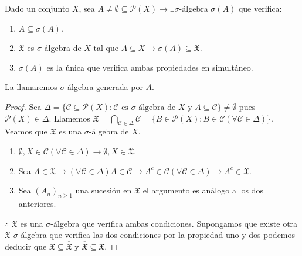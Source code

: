 \begin{prop}
    Dado un conjunto $X$, sea $A \neq \emptyset \subseteq \mathcal{P}(X) \to \exists \sigma$-álgebra $\sigma(A)$ que verifica: \begin{enumerate}
        \item $A \subseteq \sigma(A)$.
        \item $\mathfrak{X}$ es $\sigma$-álgebra de $X$ tal que $A \subseteq X \to \sigma(A) \subseteq \mathfrak{X}$.
        \item $\sigma(A)$ es la única que verifica ambas propiedades en simultáneo.
    \end{enumerate}
    La llamaremos $\sigma$-álgebra generada por $A$.

    \begin{proof}
        Sea $\Delta = \{ \mathscr{C} \subseteq \mathcal{P}(X) : \mathscr{C} \text{ es } \sigma \text{-álgebra de } X \text{ y } A \subseteq \mathscr{C} \} \neq \emptyset$ pues $\mathcal{P}(X) \in \Delta$.
        Llamemos $\mathfrak{X} = \bigcap_{\mathscr{C} \in \Delta} \mathscr{C} = \{ B \in \mathcal{P}(X) : B \in \mathscr{C} (\forall \mathscr{C} \in \Delta) \}$.
        Veamos que $\mathfrak{X}$ es una $\sigma$-álgebra de $X$.
        \begin{enumerate}
            \item $\emptyset, X \in \mathscr{C} (\forall \mathscr{C} \in \Delta) \to \emptyset, X \in \mathfrak{X}$.
            \item Sea $A \in \mathfrak{X} \to (\forall \mathscr{C} \in \Delta) A \in \mathscr{C} \to A^c \in \mathscr{C} (\forall \mathscr{C} \in \Delta) \to A^c \in \mathfrak{X}$.
            \item Sea $(A_n)_{n \geq 1}$ una sucesión en $\mathfrak{X}$ el argumento es análogo a los dos anteriores.
        \end{enumerate}
        $\therefore$ $\mathfrak{X}$ es una $\sigma$-álgebra que verifica ambas condiciones.
        Supongamos que existe otra $\overline{\mathfrak{X}}$ $\sigma$-álgebra que verifica las dos condiciones por la propiedad uno y dos podemos deducir que $\mathfrak{X} \subseteq \overline{\mathfrak{X}}$ y $\overline{\mathfrak{X}} \subseteq \mathfrak{X}$.
    \end{proof}
\end{prop}

